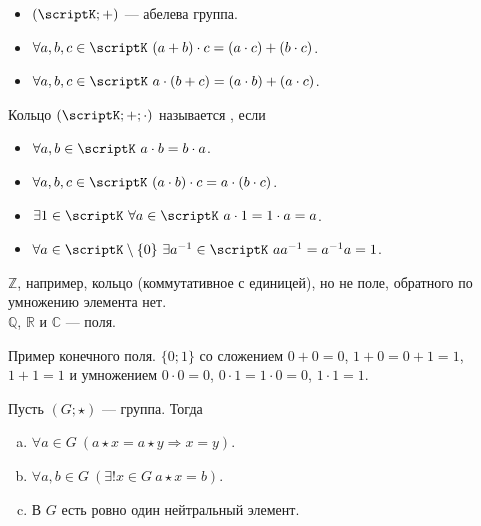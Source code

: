 \documentclass{article}
\begin{document}
\begin{itemize}
        \begin{itemize}
            \item $(\scriptK;+)$ --- абелева группа.
            \item $\forall a,b,c\in\scriptK~(a+b)\cdot c=(a\cdot c)+(b\cdot c)$.
            \item $\forall a,b,c\in\scriptK~a\cdot(b+c)=(a\cdot b)+(a\cdot c)$.
        \end{itemize}
        \dfn Кольцо $(\scriptK;+;\cdot)$ называется , если
        \begin{itemize}
            \item $\forall a,b\in\scriptK~a\cdot b=b\cdot a$.
            \item $\forall a,b,c\in\scriptK~(a\cdot b)\cdot c=a\cdot(b\cdot c)$.
            \item $\exists1\in\scriptK~\forall a\in\scriptK~a\cdot1=1\cdot a=a$.
            \item $\forall a\in\scriptK\setminus\{0\}~\exists a^{-1}\in\scriptK~aa^{-1}=a^{-1}a=1$.
        \end{itemize}
        \begin{Example}
            $\mathbb Z$, например, кольцо (коммутативное с единицей), но не поле, обратного по умножению элемента нет.\\
            $\mathbb Q$, $\mathbb R$ и $\mathbb C$ --- поля.
        \end{Example}
        \begin{Example}
            Пример конечного поля. $\{0;1\}$ со сложением $0+0=0$, $1+0=0+1=1$, $1+1=1$ и умножением $0\cdot0=0$, $0\cdot1=1\cdot0=0$, $1\cdot1=1$.
        \end{Example}
        \thm Пусть $(G;\star)$ --- группа. Тогда
        \begin{enumerate}[a.]
            \item $\forall a\in G~(a\star x=a\star y\Rightarrow x=y)$.
            \item $\forall a,b\in G~(\exists!x\in G~a\star x=b)$.
            \item В $G$ есть ровно один нейтральный элемент.
        \end{enumerate}
        \begin{Proof}
            \begin{enumerate}[a.]

\end{enumerate}
\end{Proof}
\end{itemize}
\end{document}
